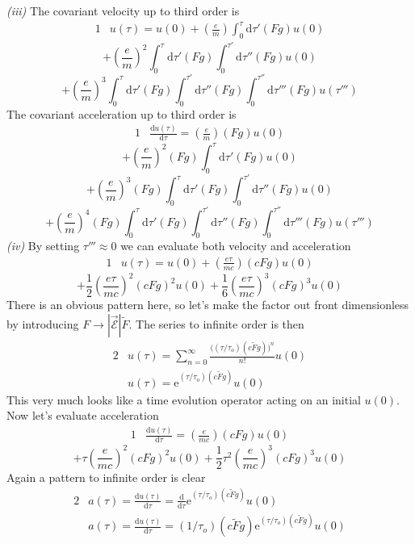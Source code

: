 \documentclass[]{article}
\numberwithin{equation}{subsection}
\begin{document}
\noindent \emph{(iii)} The covariant velocity up to third order is  
\begin{alignat}{1}
	\label{f20}	&u(\tau)=u(0)+(\frac{e}{m})\int_0^{\tau}\mathrm{d}\tau'(Fg)u(0)
\end{alignat}
$$
	+(\frac{e}{m})^{2}\int_0^{\tau}\mathrm{d}\tau'(Fg)\int_0^{\tau'}\mathrm{d}\tau''(Fg)u(0)
$$	$$
	+(\frac{e}{m})^{3}\int_0^{\tau}\mathrm{d}\tau'(Fg)\int_0^{\tau'}\mathrm{d}\tau''(Fg)\int_0^{\tau''}\mathrm{d}\tau'''(Fg)u(\tau''')
$$
The covariant acceleration up to third order is
\begin{alignat}{1}
	\label{f21}	&\frac{\mathrm{d}u(\tau)}{\mathrm{d}\tau}=(\frac{e}{m})(Fg)u(0)
\end{alignat}
$$
	+(\frac{e}{m})^{2}(Fg)\int_0^{\tau}\mathrm{d}\tau'(Fg)u(0)
$$	$$
	+(\frac{e}{m})^{3}(Fg)\int_0^{\tau}\mathrm{d}\tau'(Fg)\int_0^{\tau'}\mathrm{d}\tau''(Fg)u(0)
$$	$$
	+(\frac{e}{m})^{4}(Fg)\int_0^{\tau}\mathrm{d}\tau'(Fg)\int_0^{\tau'}\mathrm{d}\tau''(Fg)\int_0^{\tau''}\mathrm{d}\tau'''(Fg)u(\tau''')
$$
\noindent \emph{(iv)} By setting $\tau'''\approx0$ we can evaluate both velocity and acceleration
\begin{alignat}{1}
	\label{f22}	&u(\tau)=u(0)+(\frac{e\tau}{mc})(cFg)u(0)
\end{alignat}
$$
	+\frac{1}{2}(\frac{e\tau}{mc})^{2}(cFg)^{2}u(0)+\frac{1}{6}(\frac{e\tau}{mc})^{3}(cFg)^{3}u(0)
$$
There is an obvious pattern here, so let's make the factor out front dimensionless by introducing $F\rightarrow|\vec{\mathcal{E}}|\tilde{F}$. The series to infinite order is then  
\begin{alignat}{2}
	\label{f23}	&u(\tau)=\sum_{n=0}^{\infty}\frac{\Big((\tau/\tau_{o})(c\tilde{F}g)\Big)^{n}}{n!}u(0)\\
	\label{f24}	&u(\tau)=\mathrm{e}^{(\tau/\tau_{o})(c\tilde{F}g)}u(0)
\end{alignat}
This very much looks like a time evolution operator acting on an initial $u(0)$. Now let's evaluate acceleration
\begin{alignat}{1}
	\label{f25}	&\frac{\mathrm{d}u(\tau)}{\mathrm{d}\tau}=(\frac{e}{mc})(cFg)u(0)
\end{alignat}
$$
	+\tau(\frac{e}{mc})^{2}(cFg)^{2}u(0)+\frac{1}{2}\tau^{2}(\frac{e}{mc})^{3}(cFg)^{3}u(0)
$$
Again a pattern to infinite order is clear  
\begin{alignat}{2}
	\label{f26}	&a(\tau)=\frac{\mathrm{d}u(\tau)}{\mathrm{d}\tau}=\frac{\mathrm{d}}{\mathrm{d}\tau}\mathrm{e}^{(\tau/\tau_{o})(c\tilde{F}g)}u(0)\\
	\label{f27}	&a(\tau)=\frac{\mathrm{d}u(\tau)}{\mathrm{d}\tau}=(1/\tau_{o})(c\tilde{F}g)\mathrm{e}^{(\tau/\tau_{o})(c\tilde{F}g)}u(0)
\end{alignat}
\end{document}
